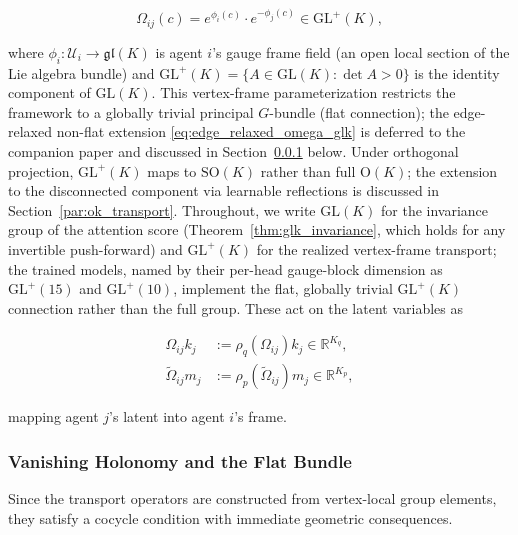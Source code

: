 \documentclass[twoside,11pt]{article}
\begin{document}
\begin{equation}
\Omega_{ij}(c) = e^{\phi_i(c)} \cdot e^{-\phi_j(c)} \in \mathrm{GL}^+(K),
\label{eq:gauge_frame_rotation}
\end{equation}

where $\phi_i: \mathcal{U}_i \to \mathfrak{gl}(K)$ is agent $i$'s gauge frame field (an open local section of the Lie algebra bundle) and $\mathrm{GL}^+(K) = \{A \in \mathrm{GL}(K) : \det A > 0\}$ is the identity component of $\mathrm{GL}(K)$. This vertex-frame parameterization restricts the framework to a globally trivial principal $G$-bundle (flat connection); the edge-relaxed non-flat extension \eqref{eq:edge_relaxed_omega_glk} is deferred to the companion paper \citep{Dennis2025it} and discussed in Section~\ref{sec:vanishing_holonomy} below. Under orthogonal projection, $\mathrm{GL}^+(K)$ maps to $\mathrm{SO}(K)$ rather than full $\mathrm{O}(K)$; the extension to the disconnected component via learnable reflections is discussed in Section~\ref{par:ok_transport}. Throughout, we write $\mathrm{GL}(K)$ for the invariance group of the attention score (Theorem~\ref{thm:glk_invariance}, which holds for any invertible push-forward) and $\mathrm{GL}^+(K)$ for the realized vertex-frame transport; the trained models, named by their per-head gauge-block dimension as $\mathrm{GL}^+(15)$ and $\mathrm{GL}^+(10)$, implement the flat, globally trivial $\mathrm{GL}^+(K)$ connection rather than the full group. These act on the latent variables as

\begin{equation}
\begin{aligned}
\Omega_{ij} k_j
&:= \rho_q(\Omega_{ij}) k_j
\in \mathbb{R}^{K_q},\\
\tilde{\Omega}_{ij} m_j
&:= \rho_p(\tilde{\Omega}_{ij}) m_j
\in \mathbb{R}^{K_p},
\end{aligned}
\label{eq:gauge_action_on_vectors}
\end{equation}

mapping agent $j$'s latent into agent $i$'s frame.

\subsubsection{Vanishing Holonomy and the Flat Bundle}
\label{sec:vanishing_holonomy}

Since the transport operators are constructed from vertex-local group elements, they satisfy a cocycle condition with immediate geometric consequences.
\end{document}

